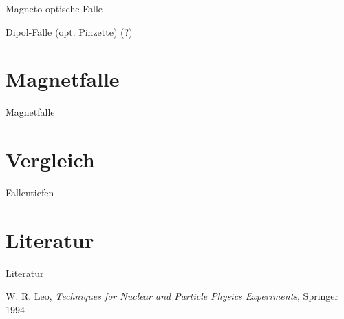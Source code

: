 \documentclass[12pt]{beamer}
\begin{document}
\begin{frame}{Magneto-optische Falle}
\end{frame}

\begin{frame}{Dipol-Falle (opt. Pinzette) (?)}
\end{frame}


\section{Magnetfalle}

\begin{frame}{Magnetfalle}
\end{frame}


\section{Vergleich}

\begin{frame}{Fallentiefen}
\end{frame}

\section{Literatur}

\begin{frame}{Literatur}
	\begin{thebibliography}{9}
		W. R. Leo,
		\emph{Techniques for Nuclear and Particle Physics Experiments},
		Springer 1994
	\end{thebibliography}
	
\end{frame}
\end{document}
